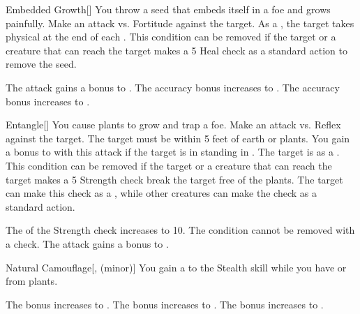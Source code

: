 \lowercase{\hypertarget{spell:Embedded Growth}{}}\label{spell:Embedded Growth}
\begin{freeability}[Rank 1]{\hypertarget{spell:Embedded Growth}{Embedded Growth}}[]
You throw a seed that embeds itself in a foe and grows painfully.
Make an attack vs. Fortitude against the target.
\hit As a , the target takes physical  at the end of each .
This condition can be removed if the target or a creature that can reach the target makes a  5 Heal check as a standard action to remove the seed.

\rankline
{} The attack gains a  bonus to .
 The accuracy bonus increases to .
 The accuracy bonus increases to .
\end{freeability}
\vspace{0.25em}



\lowercase{\hypertarget{spell:Entangle}{}}\label{spell:Entangle}
\begin{freeability}[Rank 1]{\hypertarget{spell:Entangle}{Entangle}}[]
You cause plants to grow and trap a foe.
Make an attack vs. Reflex against the target.
The target must be within 5 feet of earth or plants.
You gain a  bonus to  with this attack if the target is in standing in .
\hit The target is  as a .
This condition can be removed if the target or a creature that can reach the target makes a  5 Strength check break the target free of the plants.
The target can make this check as a , while other creatures can make the check as a standard action.

\rankline
{} The  of the Strength check increases to 10.
 The condition cannot be removed with a check.
 The attack gains a  bonus to .
\end{freeability}
\vspace{0.25em}



\lowercase{\hypertarget{spell:Natural Camouflage}{}}\label{spell:Natural Camouflage}
\begin{freeability}[Rank 1]{\hypertarget{spell:Natural Camouflage}{Natural Camouflage}}[,  (minor)]
You gain a   to the Stealth skill while you have  or  from plants.

\rankline
{} The bonus increases to .
 The bonus increases to .
 The bonus increases to .
\end{freeability}
\vspace{0.25em}



